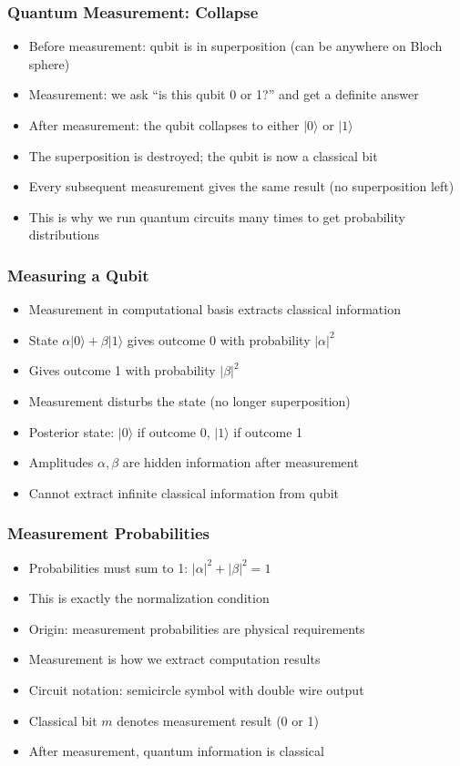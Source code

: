 \begin{frame}[fragile]\frametitle{Quantum Measurement: Collapse}
\begin{itemize}
\item Before measurement: qubit is in superposition (can be anywhere on Bloch sphere)
\item Measurement: we ask ``is this qubit 0 or 1?'' and get a definite answer
\item After measurement: the qubit collapses to either $|0\rangle$ or $|1\rangle$
\item The superposition is destroyed; the qubit is now a classical bit
\item Every subsequent measurement gives the same result (no superposition left)
\item This is why we run quantum circuits many times to get probability distributions
\end{itemize}
\end{frame}

\begin{frame}[fragile]\frametitle{Measuring a Qubit}
\begin{itemize}
\item Measurement in computational basis extracts classical information
\item State $\alpha|0\rangle + \beta|1\rangle$ gives outcome 0 with probability $|\alpha|^2$
\item Gives outcome 1 with probability $|\beta|^2$
\item Measurement disturbs the state (no longer superposition)
\item Posterior state: $|0\rangle$ if outcome 0, $|1\rangle$ if outcome 1
\item Amplitudes $\alpha, \beta$ are hidden information after measurement
\item Cannot extract infinite classical information from qubit
\end{itemize}
\end{frame}

\begin{frame}[fragile]\frametitle{Measurement Probabilities}
\begin{itemize}
\item Probabilities must sum to 1: $|\alpha|^2 + |\beta|^2 = 1$
\item This is exactly the normalization condition
\item Origin: measurement probabilities are physical requirements
\item Measurement is how we extract computation results
\item Circuit notation: semicircle symbol with double wire output
\item Classical bit $m$ denotes measurement result (0 or 1)
\item After measurement, quantum information is classical
\end{itemize}
\end{frame}


